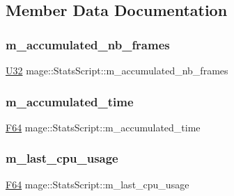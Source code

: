\subsection{Member Data Documentation}
\hypertarget{classmage_1_1_stats_script_a0a5a7a81f47e6929c3a49355e494df2e}{}\label{classmage_1_1_stats_script_a0a5a7a81f47e6929c3a49355e494df2e} 
\subsubsection{\texorpdfstring{m\+\_\+accumulated\+\_\+nb\+\_\+frames}{m\_accumulated\_nb\_frames}}
{\footnotesize\ttfamily \hyperlink{namespacemage_a41c104c036fba3756a74e19f793eeaa1}{U32} mage\+::\+Stats\+Script\+::m\+\_\+accumulated\+\_\+nb\+\_\+frames\hspace{0.3cm}{\ttfamily [private]}}

\hypertarget{classmage_1_1_stats_script_a4b7d6ce800fbec0851f4e89f9291c351}{}\label{classmage_1_1_stats_script_a4b7d6ce800fbec0851f4e89f9291c351} 
\subsubsection{\texorpdfstring{m\+\_\+accumulated\+\_\+time}{m\_accumulated\_time}}
{\footnotesize\ttfamily \hyperlink{namespacemage_ad26233bbec640deda836e572c1a23708}{F64} mage\+::\+Stats\+Script\+::m\+\_\+accumulated\+\_\+time\hspace{0.3cm}{\ttfamily [private]}}

\hypertarget{classmage_1_1_stats_script_a18ef542485b22d2f1834832cd498e7df}{}\label{classmage_1_1_stats_script_a18ef542485b22d2f1834832cd498e7df} 
\subsubsection{\texorpdfstring{m\+\_\+last\+\_\+cpu\+\_\+usage}{m\_last\_cpu\_usage}}
{\footnotesize\ttfamily \hyperlink{namespacemage_ad26233bbec640deda836e572c1a23708}{F64} mage\+::\+Stats\+Script\+::m\+\_\+last\+\_\+cpu\+\_\+usage\hspace{0.3cm}{\ttfamily [private]}}

